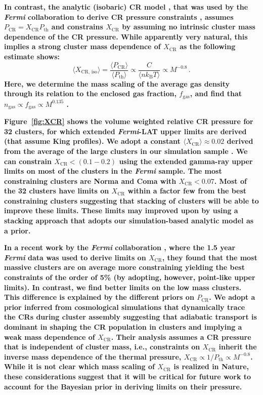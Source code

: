 \documentclass[10pt,aps,pra,reprint,amsmath,amsfonts,amssymb,showpacs,nofootinbib,floatfix]{revtex4-1}
\def\C#1{{\bf #1}}
\newcommand{\Fermi}{{\em Fermi}\xspace}
\newcommand{\rmn}{\mathrm}
\newcommand{\B}{\rmn{B}}
\newcommand{\bra}{\langle}
\newcommand{\ket}{\rangle}
\newcommand{\CR}{\rmn{CR}}
\begin{document}
\C{In contrast, the analytic (isobaric) CR model \cite{2004A&A...413...17}, that
  was used by the \Fermi collaboration to derive CR pressure constraints
  \cite{2010ApJ...717L..71A}, assumes $P_\CR = X_\CR P_\rmn{th}$ and constrains
  $X_\CR$ by assuming no intrinsic cluster mass dependence of the CR pressure.
  While apparently very natural, this implies a strong cluster mass dependence
  of $X_\CR$ as the following estimate shows:
  \begin{equation}
    \bra X_{\CR,\,\rmn{iso}}\ket = \frac{\bra P_\CR\ket}{\bra P_\rmn{th}\ket} 
    \propto \frac{C}{\bra n k_\B T\ket} \propto M^{-0.8}\,.
  \end{equation}
  Here, we determine the mass scaling of the average gas density
  through its relation to the enclosed gas fraction, $f_\rmn{gas}$, and find that
  $n_\rmn{gas}\propto f_\rmn{gas} \propto M^{0.135}$
  \cite{2009ApJ...693.1142S}.}

\C{Figure~\ref{fig:XCR} shows the volume weighted relative CR pressure for 32
  clusters, for which extended \Fermi-LAT upper limits are derived (that assume
  King profiles). We adopt a constant $\bra X_\CR\ket\approx 0.02$ derived from
  the average of the large clusters in our simulation sample
  \cite{2008MNRAS.385.1211P, 2010MNRAS.409..449P}. We can constrain $X_\CR <
  (0.1-0.2)$ using the extended gamma-ray upper limits on most of the clusters
  in the \Fermi sample. The most constraining clusters are Norma and Coma with
  $X_\CR < 0.07$. Most of the 32 clusters have limits on $X_\CR$ within a factor
  few from the best constraining clusters suggesting that stacking of clusters
  will be able to improve these limits.  These limits may improved upon by using
  a stacking approach that adopts our simulation-based analytic model as a
  prior.}

\C{In a recent work by the \Fermi collaboration \cite{2010ApJ...717L..71A},
  where the 1.5 year \Fermi data was used to derive limits on $X_\CR$, they
  found that the most massive clusters are on average more constraining yielding
  the best constraints of the order of 5\% (by adopting, however, point-like
  upper limits). In contrast, we find better limits on the low mass
  clusters. This difference is explained by the different priors on $P_\CR$.  We
  adopt a prior inferred from cosmological simulations that dynamically trace
  the CRs during cluster assembly suggesting that adiabatic transport is
  dominant in shaping the CR population in clusters and implying a weak mass
  dependence of $X_\CR$. Their analysis assumes a CR pressure that is
  independent of cluster mass, i.e., constraints on $X_\CR$ inherit the inverse
  mass dependence of the thermal pressure, $X_\CR\propto 1/P_\rmn{th}\propto
  M^{-0.8}$. While it is not clear which mass scaling of $X_\CR$ is realized in
  Nature, these considerations suggest that it will be critical for future work
  to account for the Bayesian prior in deriving limits on their pressure.}
\end{document}
